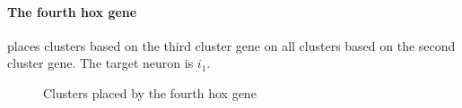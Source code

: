 \paragraph{The fourth hox gene} places clusters based on the third cluster gene on all clusters based on the second cluster gene.
The target neuron is $i_1$.
\begin{figure}[H]
    \centering
    
    \caption{Clusters placed by the fourth hox gene}
\end{figure}
